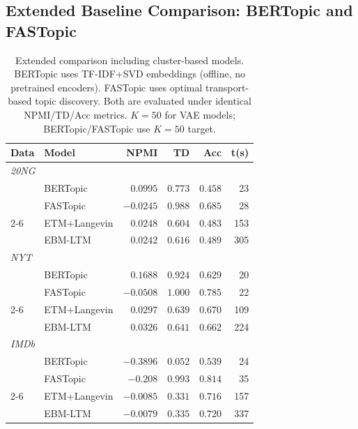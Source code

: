 \documentclass[10pt]{article}
\begin{document}
\subsection{Extended Baseline Comparison: BERTopic and FASTopic}
\label{sec:ext_baselines}

\begin{table}[t]
\centering
\caption{Extended comparison including cluster-based models. BERTopic uses
TF-IDF+SVD embeddings (offline, no pretrained encoders). FASTopic uses
optimal transport-based topic discovery. Both are evaluated under identical
NPMI/TD/Acc metrics. $K=50$ for VAE models; BERTopic/FASTopic use $K=50$ target.}
\label{tab:ext_baselines}
\setlength{\tabcolsep}{3.5pt}
\small
\begin{tabular}{llrrrr}
\hline
\textbf{Data} & \textbf{Model} &
    \textbf{NPMI} & \textbf{TD} & \textbf{Acc} & \textbf{t(s)} \\
\hline
\multicolumn{6}{l}{\textit{20NG}} \\
  & BERTopic      & $\mathbf{0.0995}$ & $0.773$ & $0.458$ & 23 \\
  & FASTopic      & $-0.0245$ & $\mathbf{0.988}$ & $\mathbf{0.685}$ & 28 \\
\cline{2-6}
  & ETM+Langevin  & $0.0248$ & $0.604$ & $0.483$ & 153 \\
  & EBM-LTM       & $0.0242$ & $0.616$ & $0.489$ & 305 \\
\hline
\multicolumn{6}{l}{\textit{NYT}} \\
  & BERTopic      & $\mathbf{0.1688}$ & $0.924$ & $0.629$ & 20 \\
  & FASTopic      & $-0.0508$ & $\mathbf{1.000}$ & $\mathbf{0.785}$ & 22 \\
\cline{2-6}
  & ETM+Langevin  & $0.0297$ & $0.639$ & $0.670$ & 109 \\
  & EBM-LTM       & $0.0326$ & $0.641$ & $0.662$ & 224 \\
\hline
\multicolumn{6}{l}{\textit{IMDb}} \\
  & BERTopic      & $-0.3896$ & $0.052$ & $0.539$ & 24 \\
  & FASTopic      & $-0.208$ & $\mathbf{0.993}$ & $\mathbf{0.814}$ & 35 \\
\cline{2-6}
  & ETM+Langevin  & $-0.0085$ & $0.331$ & $0.716$ & 157 \\
  & EBM-LTM       & $\mathbf{-0.0079}$ & $0.335$ & $0.720$ & 337 \\
\hline
\end{tabular}
\end{table}
\end{document}
